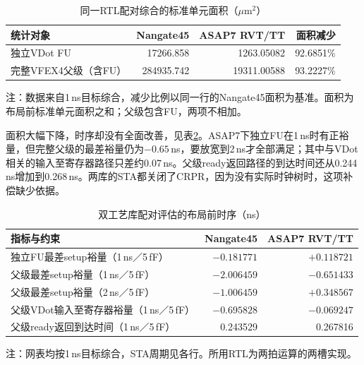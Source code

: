 \begin{table}[!htbp]\centering
\small\setlength{\tabcolsep}{5pt}
\caption{同一RTL配对综合的标准单元面积（$\mu\mathrm{m}^{2}$）}\label{tab:3-dual-library-area}
\begin{tabular}{lrrr}
\toprule
统计对象 & Nangate45 & ASAP7 RVT/TT & 面积减少\\
\midrule
独立VDot FU & 17266.858 & 1263.05082 & 92.6851\%\\
完整VFEX4父级（含FU） & 284935.742 & 19311.00588 & 93.2227\%\\
\bottomrule
\end{tabular}
\par\smallskip
\begin{minipage}{0.96\linewidth}\footnotesize
注：数据来自1\,ns目标综合，减少比例以同一行的Nangate45面积为基准。面积为布局前标准单元面积之和；父级包含FU，两项不相加。
\end{minipage}
\end{table}
\FloatBarrier

面积大幅下降，时序却没有全面改善，见表\ref{tab:3-dual-library-timing}。ASAP7下独立FU在1\,ns时有正裕量，但完整父级的最差裕量仍为$-0.65$\,ns，要放宽到2\,ns才全部满足；其中与VDot相关的输入至寄存器路径只差约0.07\,ns。父级ready返回路径的到达时间还从0.244\,ns增加到0.268\,ns。两库的STA都关闭了CRPR，因为没有实际时钟树时，这项补偿缺少依据。

\begin{table}[!htbp]\centering
\small\setlength{\tabcolsep}{5pt}
\caption{双工艺库配对评估的布局前时序（ns）}\label{tab:3-dual-library-timing}
\begin{tabular}{lrr}
\toprule
指标与约束 & Nangate45 & ASAP7 RVT/TT\\
\midrule
独立FU最差setup裕量（1\,ns／5\,fF） & $-0.181771$ & $+0.118721$\\
父级最差setup裕量（1\,ns／5\,fF） & $-2.006459$ & $-0.651433$\\
父级最差setup裕量（2\,ns／5\,fF） & $-1.006459$ & $+0.348567$\\
父级VDot输入至寄存器裕量（1\,ns／5\,fF） & $-0.695828$ & $-0.069247$\\
父级ready返回到达时间（1\,ns／5\,fF） & 0.243529 & 0.267816\\
\bottomrule
\end{tabular}
\par\smallskip
\begin{minipage}{0.96\linewidth}\footnotesize
注：网表均按1\,ns目标综合，STA周期见各行。所用RTL为两拍运算的两槽实现。
\end{minipage}
\end{table}

